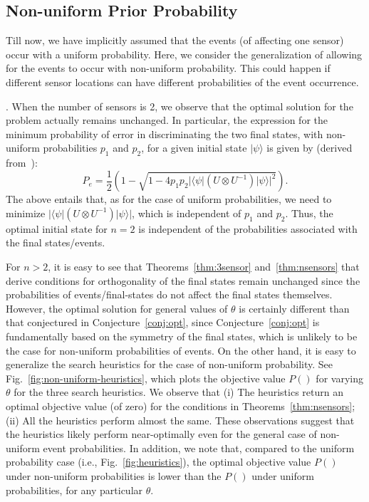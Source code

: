 \subsection{Non-uniform Prior Probability}
Till now, we have implicitly assumed that the events (of affecting one sensor) occur with
a uniform probability. Here, we consider the generalization of allowing for the events to occur
with non-uniform probability. This could happen if different sensor locations can have different
probabilities of the event occurrence.


. 
When the number of sensors is 2, we observe that the optimal solution for the \iso problem actually remains unchanged. 
In particular, the expression for the minimum probability of error in discriminating the two final states, with
non-uniform probabilities $p_1$ and $p_2$, for a given initial state $|\psi\rangle$ is given by (derived from~\cite{helstrom}):  
\begin{equation}
P_{e} = \frac{1}{2} \left( 1 - \sqrt{ 1 - 4 p_1 p_2 |\langle \psi |(U\otimes U^{-1} ) |\psi\rangle |^{2}} \right). 
\label{eqn:two-prior}
\end{equation}
The above entails that, as for the case of uniform probabilities, we need to minimize $ |\langle \psi |(U\otimes U^{-1} ) |\psi\rangle |$,
 which is independent of $p_1$ and $p_2$. Thus, the optimal initial state for $n=2$ is independent of the probabilities associated with the final states/events.

For $n>2$, it is easy to see that Theorems~\ref{thm:3sensor} and~\ref{thm:nsensors} that derive
conditions for orthogonality of the final states remain unchanged since the probabilities of 
events/final-states do not affect the final states themselves. 
However, the optimal \iso solution for general values of $\theta$ is certainly different
than that conjectured in Conjecture~\ref{conj:opt}, since Conjecture~\ref{conj:opt} is fundamentally
based on the symmetry of the final states, which is unlikely to be the case for non-uniform probabilities of
events.
On the other hand, it is easy to generalize the search heuristics for the case of non-uniform probability. See Fig.~\ref{fig:non-uniform-heuristics}, which plots the objective value $P()$ 
for varying $\theta$ for the three search heuristics. We observe that (i) The heuristics return
an optimal objective value (of zero) for the conditions in Theorems~\ref{thm:nsensors}; (ii) All the heuristics perform almost the same. 
These observations suggest that the heuristics likely perform near-optimally even for the 
general case of non-uniform event probabilities.
In addition, we note that, compared to the uniform probability case 
(i.e., Fig.~\ref{fig:heuristics}), the optimal objective value $P()$ 
under non-uniform probabilities is lower than the $P()$ under uniform probabilities, 
for any particular $\theta$.


